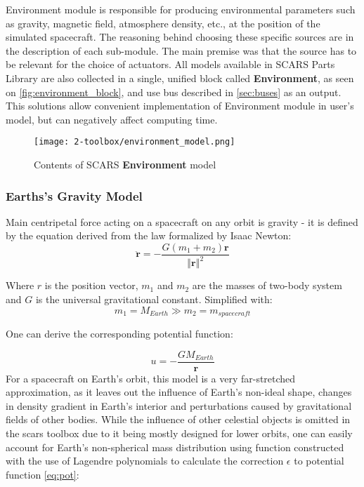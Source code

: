     Environment module is responsible for producing environmental parameters such as gravity, magnetic field, atmosphere density, etc., at the position of the simulated spacecraft. The reasoning behind choosing these specific sources are in the description of each sub-module. The main premise was that the source has to be relevant for the choice of actuators. All models available in SCARS Parts Library are also collected in a single, unified block called \textbf{Environment}, as seen on \autoref{fig:environment_block}, and use bus described in \autoref{sec:buses} as an output. This solutions allow convenient implementation of Environment module in user's model, but can negatively affect computing time.

    \begin{figure}[H]
        \centering
        \texttt{[image: 2-toolbox/environment\_model.png]}
        \caption{Contents of SCARS \textbf{Environment} model}
        \label{fig:environment_block}
    \end{figure}

        
    \subsubsection{Earths's Gravity Model}
        Main centripetal force acting on a spacecraft on any orbit is gravity - it is defined by the equation derived from the law formalized by Isaac Newton:
        \begin{equation}
            \ddot{\textbf{r}} = -\frac{G(m_1+m_2)\textbf{r}}{\left\Vert \textbf{r} \right\Vert^2}
        \end{equation}

        Where $r$ is the position vector, $m_1$ and $m_2$ are the masses of two-body system and $G$ is the universal gravitational constant. Simplified with:
        \begin{equation}
            m_1 = M_{Earth} \gg m_2 = m_{spacecraft}
        \end{equation}

        One can derive the corresponding potential function:
        
        \begin{equation}
            u = -\frac{GM_{Earth}}{\textbf{r}}\label{eq:pot}
        \end{equation}
        For a spacecraft on Earth's orbit, this model is a very far-stretched approximation, as it leaves out the influence of Earth's non-ideal shape, changes in density gradient in Earth's interior and perturbations caused by gravitational fields of other bodies. While the influence of other celestial objects is omitted in the \ac{scars} toolbox due to it being mostly designed for lower orbits, one can easily account for Earth's non-spherical mass distribution using function constructed with the use of Lagendre polynomials to calculate the correction $\epsilon$ to potential function \eqref{eq:pot}:

